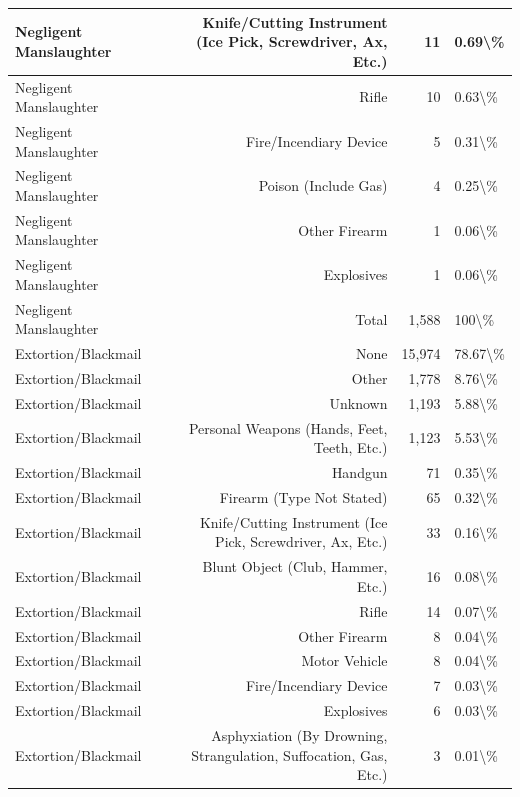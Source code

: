 \documentclass[
]{krantz}
\begin{document}
\begin{longtable}[t]{l|r|r|l}
\hline
Negligent Manslaughter & Knife/Cutting Instrument (Ice Pick, Screwdriver, Ax, Etc.) & 11 & 0.69\textbackslash{}\%\\
\hline
Negligent Manslaughter & Rifle & 10 & 0.63\textbackslash{}\%\\
\hline
Negligent Manslaughter & Fire/Incendiary Device & 5 & 0.31\textbackslash{}\%\\
\hline
Negligent Manslaughter & Poison (Include Gas) & 4 & 0.25\textbackslash{}\%\\
\hline
Negligent Manslaughter & Other Firearm & 1 & 0.06\textbackslash{}\%\\
\hline
Negligent Manslaughter & Explosives & 1 & 0.06\textbackslash{}\%\\
\hline
Negligent Manslaughter & Total & 1,588 & 100\textbackslash{}\%\\
\hline
Extortion/Blackmail & None & 15,974 & 78.67\textbackslash{}\%\\
\hline
Extortion/Blackmail & Other & 1,778 & 8.76\textbackslash{}\%\\
\hline
Extortion/Blackmail & Unknown & 1,193 & 5.88\textbackslash{}\%\\
\hline
Extortion/Blackmail & Personal Weapons (Hands, Feet, Teeth, Etc.) & 1,123 & 5.53\textbackslash{}\%\\
\hline
Extortion/Blackmail & Handgun & 71 & 0.35\textbackslash{}\%\\
\hline
Extortion/Blackmail & Firearm (Type Not Stated) & 65 & 0.32\textbackslash{}\%\\
\hline
Extortion/Blackmail & Knife/Cutting Instrument (Ice Pick, Screwdriver, Ax, Etc.) & 33 & 0.16\textbackslash{}\%\\
\hline
Extortion/Blackmail & Blunt Object (Club, Hammer, Etc.) & 16 & 0.08\textbackslash{}\%\\
\hline
Extortion/Blackmail & Rifle & 14 & 0.07\textbackslash{}\%\\
\hline
Extortion/Blackmail & Other Firearm & 8 & 0.04\textbackslash{}\%\\
\hline
Extortion/Blackmail & Motor Vehicle & 8 & 0.04\textbackslash{}\%\\
\hline
Extortion/Blackmail & Fire/Incendiary Device & 7 & 0.03\textbackslash{}\%\\
\hline
Extortion/Blackmail & Explosives & 6 & 0.03\textbackslash{}\%\\
\hline
Extortion/Blackmail & Asphyxiation (By Drowning, Strangulation, Suffocation, Gas, Etc.) & 3 & 0.01\textbackslash{}\%\\

\end{longtable}
\end{document}
